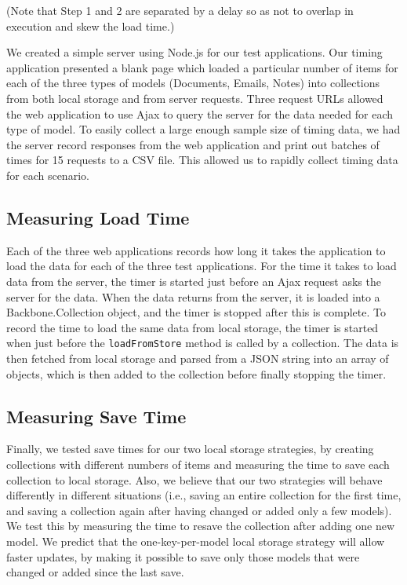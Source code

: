 \documentclass[12pt]{article}
\begin{document}
(Note that Step 1 and 2 are separated by a delay so as not to overlap in
execution and skew the load time.)

We created a simple server using Node.js \cite{node} for our test applications. Our timing
application presented a blank page which loaded a particular number of items
for each of the three types of models (Documents, Emails, Notes) into collections from both local storage
and from server requests. Three request URLs allowed the web application to use
Ajax to query the server for the data needed for each type of model. To easily
collect a large enough sample size of timing data, we had the server record
responses from the web application and print out batches of times for 15
requests to a CSV file. This allowed us to rapidly collect timing data for each
scenario.

\subsection{Measuring Load Time}

Each of the three web applications records how long it takes the application to
load the data for each of the three test applications. For the time it takes to
load data from the server, the timer is started just before an Ajax request
asks the server for the data. When the data returns from the server, it is
loaded into a Backbone.Collection object, and the timer is stopped after this
is complete. To record the time to load the same data from local storage, the
timer is started when just before the \verb=loadFromStore= method is called by
a collection. The data is then fetched from local storage and parsed from a JSON
string into an array of objects, which is then added to the collection before
finally stopping the timer.

\subsection{Measuring Save Time}

Finally, we tested save times for our two local storage strategies, by
creating collections with different numbers of items and measuring the time to
save each collection to local storage. Also, we believe that our two strategies
will behave differently in different situations (i.e., saving an entire
collection for the first time, and saving a collection again after having
changed or added only a few models). We test this by measuring the time to
resave the collection after adding one new model. We predict that the
one-key-per-model local storage strategy will allow faster updates, by making
it possible to save only those models that were changed or added since the last
save.
\end{document}
